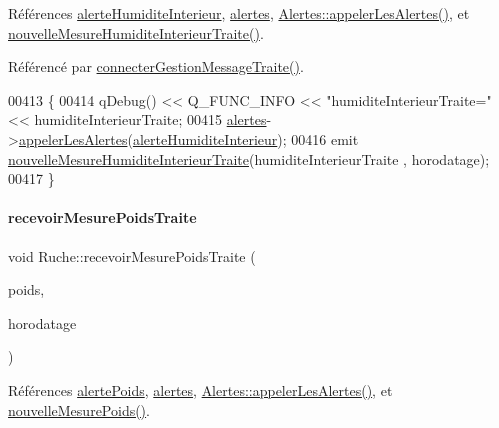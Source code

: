 Références \hyperlink{parametres_8h_a83a725fd153179a2bd97afcc8307737bac0e80b2d9b7f04033abc44ebcf61883a}{alerte\+Humidite\+Interieur}, \hyperlink{class_ruche_af07644ddce44cb5ed4286475dc0f9d46}{alertes}, \hyperlink{class_alertes_ad04a02dcc6e6f14da0784c7054888b05}{Alertes\+::appeler\+Les\+Alertes()}, et \hyperlink{class_ruche_abb16e6c9eef6640a3a216f856cf8d0f5}{nouvelle\+Mesure\+Humidite\+Interieur\+Traite()}.



Référencé par \hyperlink{class_ruche_a20ec8c6dc931218e5cf682050fe845d9}{connecter\+Gestion\+Message\+Traite()}.


\begin{DoxyCode}
00413 \{    
00414     qDebug() << Q\_FUNC\_INFO << \textcolor{stringliteral}{"humiditeInterieurTraite="} << humiditeInterieurTraite;
00415     \hyperlink{class_ruche_af07644ddce44cb5ed4286475dc0f9d46}{alertes}->\hyperlink{class_alertes_ad04a02dcc6e6f14da0784c7054888b05}{appelerLesAlertes}(\hyperlink{parametres_8h_a83a725fd153179a2bd97afcc8307737bac0e80b2d9b7f04033abc44ebcf61883a}{alerteHumiditeInterieur});
00416     emit \hyperlink{class_ruche_abb16e6c9eef6640a3a216f856cf8d0f5}{nouvelleMesureHumiditeInterieurTraite}(humiditeInterieurTraite
      , horodatage);
00417 \}
\end{DoxyCode}
\mbox{\label{class_ruche_afd8b0d7512f325327704cd3e37091dc2}} 
\paragraph{\texorpdfstring{recevoir\+Mesure\+Poids\+Traite}{recevoirMesurePoidsTraite}}
{\footnotesize\ttfamily void Ruche\+::recevoir\+Mesure\+Poids\+Traite (\begin{DoxyParamCaption}\item[{double}]{poids,  }\item[{Q\+String}]{horodatage }\end{DoxyParamCaption})\hspace{0.3cm}{\ttfamily [slot]}}



Références \hyperlink{parametres_8h_a83a725fd153179a2bd97afcc8307737ba130a82230092934eb515b95603d12956}{alerte\+Poids}, \hyperlink{class_ruche_af07644ddce44cb5ed4286475dc0f9d46}{alertes}, \hyperlink{class_alertes_ad04a02dcc6e6f14da0784c7054888b05}{Alertes\+::appeler\+Les\+Alertes()}, et \hyperlink{class_ruche_abe5e5d4f4070766d5295d4dc6e0ce03c}{nouvelle\+Mesure\+Poids()}.



